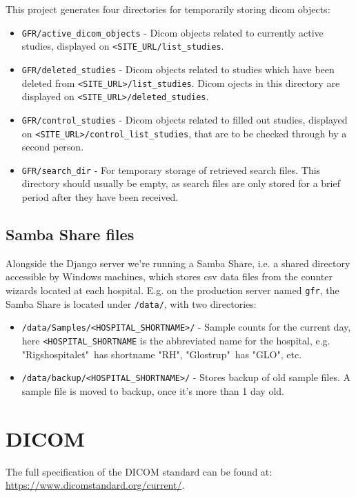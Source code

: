 \documentclass{article}
\begin{document}
This project generates four directories for temporarily storing dicom objects:
\begin{itemize}
	\item \texttt{GFR/active\_dicom\_objects} - Dicom objects related to currently active studies, displayed on \texttt{<SITE\_URL/list\_studies}.
	\item \texttt{GFR/deleted\_studies} - Dicom objects related to studies which have been deleted from \texttt{<SITE\_URL>/list\_studies}. Dicom ojects in this directory are displayed on \texttt{<SITE\_URL>/deleted\_studies}.
	\item \texttt{GFR/control\_studies} - Dicom objects related to filled out studies, displayed on \texttt{<SITE\_URL>/control\_list\_studies}, that are to be checked through by a second person.
	\item \texttt{GFR/search\_dir} - For temporary storage of retrieved search files. This directory should usually be empty, as search files are only stored for a brief period after they have been received.
\end{itemize}

\subsection{Samba Share files}
Alongside the Django server we're running a Samba Share, i.e. a shared directory accessible by Windows machines, which stores csv data files from the counter wizards located at each hospital. E.g. on the production server named \texttt{gfr}, the Samba Share is located under \texttt{/data/}, with two directories:
\begin{itemize}
	\item \texttt{/data/Samples/<HOSPITAL\_SHORTNAME>/} - Sample counts for the current day, here \texttt{<HOSPITAL\_SHORTNAME} is the abbreviated name for the hospital, e.g. "Rigshospitalet"\ has shortname "RH", "Glostrup"\ has "GLO", etc.
	\item \texttt{/data/backup/<HOSPITAL\_SHORTNAME>/} - Stores backup of old sample files. A sample file is moved to backup, once it's more than 1 day old.
\end{itemize}

\section{DICOM}
The full specification of the DICOM standard can be found at:\\ \url{https://www.dicomstandard.org/current/}. \\
\end{document}
